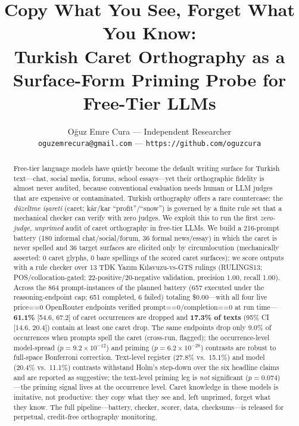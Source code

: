 \documentclass[11pt]{article}
\title{Copy What You See, Forget What You Know:\\
Turkish Caret Orthography as a Surface-Form Priming Probe for Free-Tier LLMs}
\author{O\u{g}uz Emre Cura --- Independent Researcher \\
  \texttt{oguzemrecura@gmail.com} --- \texttt{https://github.com/oguzcura}}
\date{}
\begin{document}
\maketitle

\begin{abstract}
Free-tier language models have quietly become the default writing surface for Turkish text---chat, social media, forums, school essays---yet their orthographic fidelity is almost never audited, because conventional evaluation needs human or LLM judges that are expensive or contaminated. Turkish orthography offers a rare countercase: the \emph{d{\"u}zeltme i{\c s}areti} (caret; k{\^a}r/kar ``profit''/``snow'') is governed by a finite rule set that a mechanical checker can verify with zero judges. We exploit this to run the first \emph{zero-judge, unprimed} audit of caret orthography in free-tier LLMs. We build a 216-prompt battery (180 informal chat/social/forum, 36 formal news/essay) in which the caret is never spelled and 36 target surfaces are elicited only by circumlocution (mechanically asserted: 0 caret glyphs, 0 bare spellings of the scored caret surfaces); we score outputs with a rule checker over 13 TDK Yaz{\i}m K{\i}lavuzu-vs-GTS rulings (RULINGS13; POS/collocation-gated; 22-positive/20-negative validation, precision 1.00, recall 1.00). Across the 864 prompt-instances of the planned battery (657 executed under the reasoning-endpoint cap; 651 completed, 6 failed) totaling \$0.00---with all four live price==0 OpenRouter endpoints verified prompt==0/completion==0 at run time---\textbf{61.1\%} [54.6, 67.2] of caret occurrences are dropped and \textbf{17.3\% of texts} (95\% CI [14.6, 20.4]) contain at least one caret drop. The same endpoints drop only 9.0\% of occurrences when prompts spell the caret (cross-run, flagged); the occurrence-level model-spread ($p{=}9.2\times10^{-12}$) and priming ($p{=}6.2\times10^{-28}$) contrasts are robust to full-space Bonferroni correction. Text-level register (27.8\% vs.\ 15.1\%) and model (20.4\% vs.\ 11.1\%) contrasts withstand Holm's step-down over the six headline claims and are reported as suggestive; the text-level priming leg is \emph{not} significant ($p{=}0.074$)---the priming signal lives at the occurrence level. Caret knowledge in these models is imitative, not productive: they copy what they see and, left unprimed, forget what they know. The full pipeline---battery, checker, scorer, data, checksums---is released for perpetual, credit-free orthography monitoring.
\end{abstract}
\end{document}

